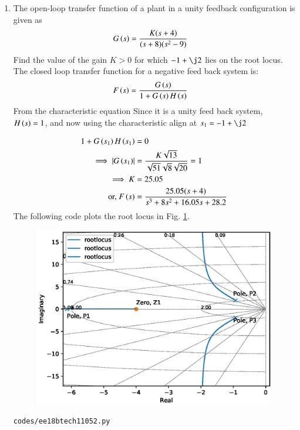 \begin{enumerate}[label=\thesubsection.\arabic*.,ref=\thesubsection.\theenumi]

\item
 The open-loop transfer function of a plant in a unity feedback configuration is given as 
\begin{align}
    G\left(s\right) &= \frac{K(s+4)}{(s+8)(s^{2}-9)}
\end{align}
Find  the value of the gain $K>0$ for which $-1 + \j2$ lies on the root locus.
%
\\
\solution
  The closed loop transfer function for a negative feed back system is:
  \begin{align}
      F\left(s\right) &= \frac{G\left(s\right)}{1+G\left(s\right)H\left(s\right)}
  \end{align}
%
From the characteristic equation
Since it is a unity feed back system, $H\left(s\right) = 1$, and now using the characteristic align at $s_{1} = -1 + \j2$

\begin{align}
    1 + G\left(s_{1}\right)H\left(s_{1}\right) &= 0 
\\
\implies    \left\vert G\left(s_{1}\right)\right\vert &= \frac{K\sqrt{13}}{\sqrt{51}\sqrt{8}\sqrt{20}} = 1 
\\
\implies     K &= 25.05
\\
\text{or, }    F\left(s\right) &= \frac{25.05(s+4)}{s^{3}+8s^{2}+16.05s+28.2} 
\end{align}
%
The following code plots the root locus in Fig. \ref{fig:ee18btech11052}.
%
\begin{figure}
\centering
\includegraphics[width =\columnwidth]{./figs/ee18btech11052.eps}
\caption{}
\label{fig:ee18btech11052}
\end{figure}


\begin{lstlisting}
codes/ee18btech11052.py
\end{lstlisting}
    
\end{enumerate}

